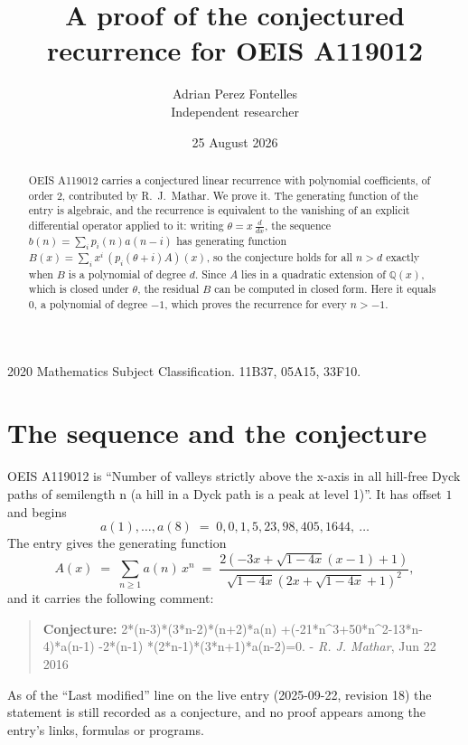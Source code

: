 \documentclass[11pt,a4paper]{article}
\title{A proof of the conjectured recurrence for OEIS A119012}
\author{Adrian Perez Fontelles\\ \small Independent researcher}
\date{25 August 2026}
\theoremstyle{plain}
\theoremstyle{definition}
\begin{document}
\maketitle

\begin{abstract}
OEIS A119012 carries a conjectured linear recurrence with polynomial coefficients, of
order 2, contributed by R.~J.~Mathar. We prove it. The generating function of the
entry is algebraic, and the recurrence is equivalent to the vanishing of an explicit
differential operator applied to it: writing $\theta=x\,\frac{d}{dx}$, the sequence
$b(n)=\sum_{i}p_{i}(n)a(n-i)$ has generating function
$B(x)=\sum_{i}x^{i}\,(p_{i}(\theta+i)A)(x)$, so the conjecture holds for all $n>d$ exactly
when $B$ is a polynomial of degree $d$. Since $A$ lies in a quadratic extension of
$\mathbb{Q}(x)$, which is closed under $\theta$, the residual $B$ can be computed in
closed form. Here it equals $0$, a polynomial of degree $-1$, which proves
the recurrence for every $n>-1$.
\end{abstract}

\noindent\small 2020 Mathematics Subject Classification. 11B37, 05A15, 33F10.\normalsize

\section{The sequence and the conjecture}

OEIS A119012 is ``Number of valleys strictly above the x-axis in all hill-free Dyck paths of semilength n (a hill in a Dyck path is a peak at level 1)''. It has offset $1$ and begins
\[
a(1),\dots,a(8)\;=\;0, 0, 1, 5, 23, 98, 405, 1644,\ \dots
\]
The entry gives the generating function
\begin{equation}\label{eq:gf}
A(x)\;=\;\sum_{n\ge 1} a(n)\,x^{n}\;=\;\frac{2 \left(- 3 x + \sqrt{1 - 4 x} \left(x - 1\right) + 1\right)}{\sqrt{1 - 4 x} \left(2 x + \sqrt{1 - 4 x} + 1\right)^{2}} ,
\end{equation}
and it carries the following comment:
\begin{quote}\small
\textbf{Conjecture:} 2*(n-3)*(3*n-2)*(n+2)*a(n) +(-21*n\^{}3+50*n\^{}2-13*n-4)*a(n-1) -2*(n-1) *(2*n-1)*(3*n+1)*a(n-2)=0. - \emph{R. J. Mathar}, Jun 22 2016
\end{quote}
As of the ``Last modified'' line on the live entry (2025-09-22, revision 18) the
statement is still recorded as a conjecture, and no proof appears among the entry's links,
formulas or programs.
\end{document}
